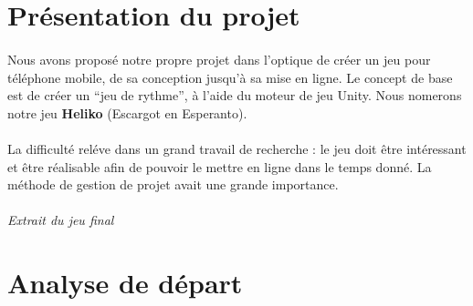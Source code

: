 \section{Présentation du projet}

\paragraph{}
Nous avons proposé notre propre projet dans l’optique de créer un jeu pour téléphone mobile, de sa conception jusqu’à sa mise en ligne. Le concept de base est de créer un “jeu de rythme”, à l'aide du moteur de jeu Unity. Nous nomerons notre jeu \textbf{Heliko} (Escargot en Esperanto).

\paragraph{}
La difficulté reléve dans un grand travail de recherche : le jeu doit être intéressant et être réalisable afin de pouvoir le mettre en ligne dans le temps donné. La méthode de gestion de projet avait une grande importance.

\paragraph{}
\noindent
{}
\begin{center}
\textit{Extrait du jeu final}
\end{center}

\section{Analyse de départ}

